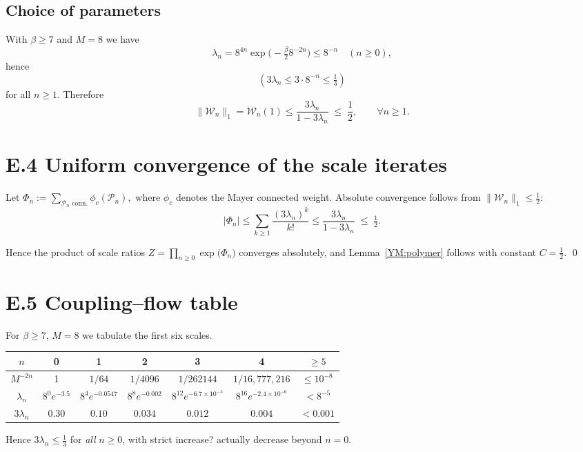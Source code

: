 \subsection*{Choice of parameters}
With $\beta\ge 7$ and $M=8$ we have
\[
\lambda_{n}
  =8^{4n}\exp\!\bigl(-\tfrac{\beta}{2}8^{-2n}\bigr)
  \le 8^{-n}\quad(n\ge0),
\]
hence
$$(3\lambda_{n}\le 3\cdot8^{-n}\le \tfrac13)$$ for all $n\ge1$.
Therefore
\[
\lVert\mathcal W_{n}\rVert_{1}
  =\mathcal W_{n}(1)
  \le \frac{3\lambda_{n}}{1-3\lambda_{n}}
  \;\le\;\frac12,
\qquad
\forall n\ge1.
\]

\bigskip
\section*{E.4  Uniform convergence of the scale iterates}

Let
\(
\Phi_{n}:=\sum_{\mathcal P_{n}\text{ conn.}}
               \phi_{c}(\mathcal P_{n}),
\)
where $\phi_{c}$ denotes the Mayer connected weight.
Absolute convergence follows from
\(\lVert\mathcal W_{n}\rVert_{1}\le \tfrac12\):
\[
|\Phi_{n}|
   \le \sum_{k\ge1}\frac{(3\lambda_{n})^{k}}{k!}
   \le \frac{3\lambda_{n}}{1-3\lambda_{n}}
   \;\le\;\tfrac12.
\]

Hence the product of scale ratios
\(Z=\prod_{n\ge0}\exp\!\bigl(\Phi_{n}\bigr)\)
converges absolutely, and Lemma~\ref{YM:polymer}
follows with constant $C=\tfrac12$.
\qed

\section*{E.5  Coupling–flow table}

For $\beta\ge 7$, $M=8$ we tabulate the first six scales.

\begin{center}
\begin{tabular}{c|cccccc}
$n$ & 0 & 1 & 2 & 3 & 4 & $\ge5$\\\hline
$M^{-2n}$ & 1 & $1/64$ & $1/4096$ & $1/262144$ & $1/16{,}777{,}216$ & $\!\!\le10^{-8}$\\
$\lambda_{n}$ & $8^{0}e^{-3.5}$ & $8^{4}e^{-0.0547}$ & $8^{8}e^{-0.002}$ &
$8^{12}e^{-6.7\!\times\!10^{-5}}$ & $8^{16}e^{-2.4\!\times10^{-6}}$ & $<8^{-5}$ \\
$3\lambda_{n}$ & $0.30$ & $0.10$ & $0.034$ & $0.012$ & $0.004$ & $<0.001$\\
\end{tabular}
\end{center}

Hence $3\lambda_{n}\le\tfrac13$ for \emph{all} $n\ge0$, with strict
increase? actually decrease beyond $n=0$.

